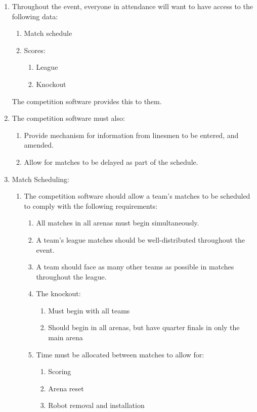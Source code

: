\begin{enumerate}
\item Throughout the event, everyone in attendance will want to have access to the following data:
  \begin{enumerate}
  \item Match schedule
  \item Scores:
    \begin{enumerate}
    \item League
    \item Knockout
    \end{enumerate}
  \end{enumerate}
  The competition software provides this to them.

\item The competition software must also:
  \begin{enumerate}
  \item Provide mechanism for information from linesmen to be entered, and amended.
  \item Allow for matches to be delayed as part of the schedule.
  \end{enumerate}

\item Match Scheduling:
  \begin{enumerate}
  \item The competition software should allow a team's matches to be scheduled to comply with the following requirements:
    \begin{enumerate}
    \item All matches in all arenas must begin simultaneously.
    \item A team's league matches should be well-distributed throughout the event.
    \item A team should face as many other teams as possible in matches throughout the league.
    \item The knockout:
      \begin{enumerate}
      \item Must begin with all teams
      \item Should begin in all arenas, but have quarter finals in only the main arena
      \end{enumerate}
    \item Time must be allocated between matches to allow for:
      \begin{enumerate}
      \item Scoring
      \item Arena reset
      \item Robot removal and installation
      \end{enumerate}
    \end{enumerate}
  \end{enumerate}

\end{enumerate}







